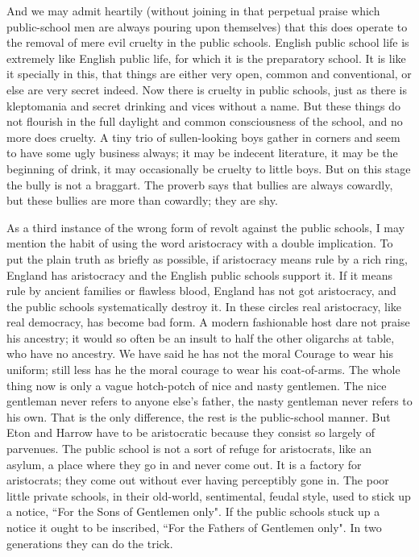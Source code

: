 \documentclass[final,10pt,letterpaper,twocolumn,openany]{book}
\begin{document}
And we may admit heartily (without joining in
that perpetual praise which public-school men are always pouring upon
themselves) that this does operate to the removal of mere evil cruelty in
the public schools. English public school life is extremely like English
public life, for which it is the preparatory school. It is like it specially in
this, that things are either very open, common and conventional, or else
are very secret indeed. Now there is cruelty in public schools, just as there
is kleptomania and secret drinking and vices without a name. But these
things do not flourish in the full daylight and common consciousness of
the school, and no more does cruelty. A tiny trio of sullen-looking boys
gather in corners and seem to have some ugly business always; it may be
indecent literature, it may be the beginning of drink, it may occasionally
be cruelty to little boys. But on this stage the bully is not a braggart. The
proverb says that bullies are always cowardly, but these bullies are more
than cowardly; they are shy.

As a third instance of the wrong form of revolt against the public
schools, I may mention the habit of using the word aristocracy with a
double implication. To put the plain truth as briefly as possible, if
aristocracy means rule by a rich ring, England has aristocracy and the
English public schools support it. If it means rule by ancient families or
flawless blood, England has not got aristocracy, and the public schools
systematically destroy it. In these circles real aristocracy, like real
democracy, has become bad form. A modern fashionable host dare not
praise his ancestry; it would so often be an insult to half the other
oligarchs at table, who have no ancestry. We have said he has not the
moral Courage to wear his uniform; still less has he the moral courage to
wear his coat-of-arms. The whole thing now is only a vague hotch-potch
of nice and nasty gentlemen. The nice gentleman never refers to anyone
else's father, the nasty gentleman never refers to his own. That is the only
difference, the rest is the public-school manner. But Eton and Harrow have
to be aristocratic because they consist so largely of parvenues. The public
school is not a sort of refuge for aristocrats, like an asylum, a place where
they go in and never come out. It is a factory for aristocrats; they come out
without ever having perceptibly gone in. The poor little private schools, in
their old-world, sentimental, feudal style, used to stick up a notice, ``For
the Sons of Gentlemen only". If the public schools stuck up a notice it
ought to be inscribed, ``For the Fathers of Gentlemen only". In two
generations they can do the trick.
\end{document}

